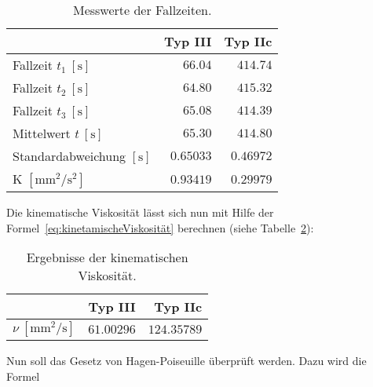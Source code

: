             \begin{table}[H]
                \centering
                \caption{Messwerte der Fallzeiten.}
                \vspace*{.5em}
                \begin{tabular}{|l||r|r|}
                    \hline
                    & Typ III & Typ IIc\\
                    \hline\hline
                    Fallzeit $t_{1}\ [\mathrm{s}]$ & $66.04$ & $414.74$\\
                    Fallzeit $t_{2}\ [\mathrm{s}]$ & $64.80$ & $415.32$\\
                    Fallzeit $t_{3}\ [\mathrm{s}]$ & $65.08$ & $414.39$\\
                    \hline
                    Mittelwert $t\ [\mathrm{s}]$ & $65.30$ & $414.80$\\
                    Standardabweichung $[\mathrm{s}]$ & $0.65033$ & $0.46972$\\
                    \hline
                    K $\mathrm{[mm^{2}/s^{2}]}$ & $0.93419$ & $0.29979$\\
                    \hline
                \end{tabular}
                \label{tab:MesswerteKapillarviskosimeter}
            \end{table}

            Die kinematische Viskosität lässt sich nun mit Hilfe der Formel~\ref{eq:kinetamischeViskosität} berechnen (siehe Tabelle~\ref{tab:ErgebnisseKapillarviskosimeter}):

            \begin{table}[H]
                \centering
                \caption{Ergebnisse der kinematischen Viskosität.}
                \vspace*{.5em}
                \begin{tabular}{|l||r|r|}
                    \hline
                    & Typ III & Typ IIc\\
                    \hline\hline
                    $\nu\ [\mathrm{mm^{2}/s}]$ & $61.00296$ & $124.35789$\\
                    \hline
                \end{tabular}
                \label{tab:ErgebnisseKapillarviskosimeter}
            \end{table}

            Nun soll das Gesetz von Hagen-Poiseuille überprüft werden. Dazu wird die Formel


